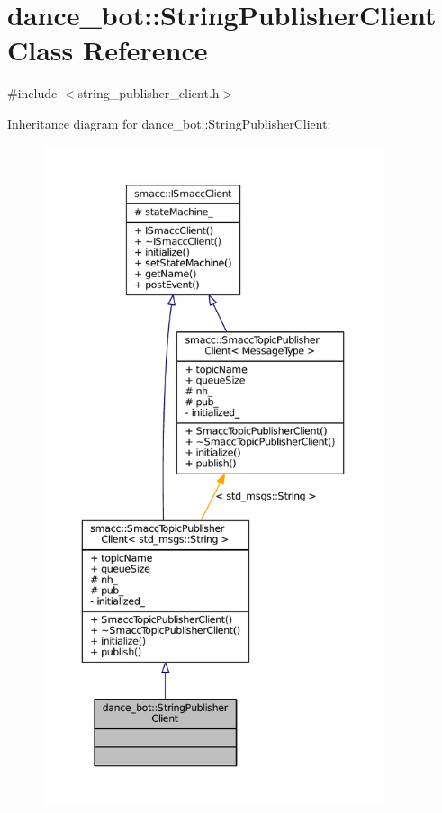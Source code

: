\hypertarget{classdance__bot_1_1StringPublisherClient}{}\section{dance\+\_\+bot\+:\+:String\+Publisher\+Client Class Reference}
\label{classdance__bot_1_1StringPublisherClient}


{\ttfamily \#include $<$string\+\_\+publisher\+\_\+client.\+h$>$}



Inheritance diagram for dance\+\_\+bot\+:\+:String\+Publisher\+Client\+:
\nopagebreak
\begin{figure}[H]
\begin{center}
\leavevmode
\includegraphics[height=550pt]{classdance__bot_1_1StringPublisherClient__inherit__graph}
\end{center}
\end{figure}


